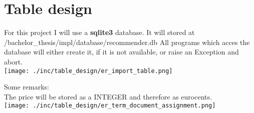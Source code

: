 

\section{Table design}
For this project I will use a \textbf{sqlite3} database.
It will stored at /bachelor\_thesis/impl/database/recommender.db
All programs which acces the database will either create it, if it is not available, or raise an Exception and abort.\\

\bigskip
\texttt{[image: ./inc/table\_design/er\_import\_table.png]}

\bigskip
{}

\bigskip
Some remarks:\\
The price will be stored as a INTEGER and therefore as eurocents.\\



\bigskip
\texttt{[image: ./inc/table\_design/er\_term\_document\_assignment.png]}
\bigskip
{}




